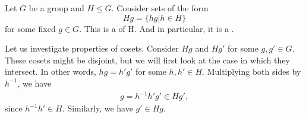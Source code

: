 \documentclass{article}
\numberwithin{equation}{section}
\begin{document}
\begin{definition}
    Let $G$ be a group and $H\le G.$ Consider sets of the form
    \begin{equation*}
        Hg = \{hg|h\in H\}
    \end{equation*}
    for some fixed $g\in G.$ This is a  of H. And in particular, it is a .
\end{definition}
Let us investigate properties of cosets. Consider $Hg$ and $Hg'$ for some $g,g'\in G.$ These cosets might be disjoint, but we will first look at the case in which they intersect. In other words, $hg=h'g'$ for some $h,h'\in H$. Multiplying both sides by $h^{-1}$, we have
\begin{align*}
    g=h^{-1}h'g' \in Hg',
\end{align*}
since $h^{-1}h'\in H.$ Similarly, we have $g'\in Hg.$
\end{document}
